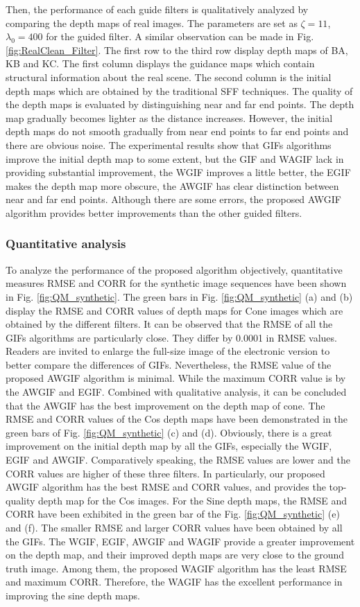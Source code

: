 \documentclass[a4paper,fleqn]{cas-dc}
\begin{document}
Then, the performance of each guide filters is qualitatively analyzed by comparing the depth maps of real images. The parameters are set as $\zeta = 11$, $\lambda_0 = 400$ for the guided filter. A similar observation can be made in Fig. \ref{fig:RealClean_Filter}. The first row to the third row display depth maps of BA, KB and KC. The first column displays the guidance maps which contain structural information about the real scene. The second column is the initial depth maps which are obtained by the traditional SFF techniques. The quality of the depth maps is evaluated by distinguishing near and far end points. The depth map gradually becomes lighter as the distance increases. However, the initial depth maps do not smooth gradually from near end points to far end points and there are obvious noise. The experimental results show that GIFs algorithms improve the initial depth map to some extent, but the GIF and WAGIF lack in providing substantial improvement, the WGIF improves a little better, the EGIF makes the depth map more obscure, the AWGIF has clear distinction between near and far end points. Although there are some errors, the proposed AWGIF algorithm provides better improvements than the other guided filters.

\subsubsection{Quantitative analysis}\label{Quantitative}
To analyze the performance of the proposed algorithm objectively, quantitative measures RMSE and CORR for the synthetic image sequences have been shown in Fig. \ref{fig:QM_synthetic}. The green bars in Fig. \ref{fig:QM_synthetic} (a) and (b) display the RMSE and CORR values of depth maps for Cone images which are obtained by the different filters. It can be observed that the RMSE of all the GIFs algorithms are particularly close. They differ by 0.0001 in RMSE values. Readers are invited to enlarge the full-size image of the electronic version to better compare the differences of GIFs. Nevertheless, the RMSE value of the proposed AWGIF algorithm is minimal. While the maximum CORR value is by the AWGIF and EGIF. Combined with qualitative analysis, it can be concluded that the AWGIF has the best improvement on the depth map of cone. The RMSE and CORR values of the Cos depth maps have been demonstrated in the green bars of Fig. \ref{fig:QM_synthetic} (c) and (d). Obviously, there is a great improvement on the initial depth map by all the GIFs, especially the WGIF, EGIF and AWGIF. Comparatively speaking, the RMSE values are lower and the CORR values are higher of these three filters. In particularly, our proposed AWGIF algorithm has the best RMSE and CORR values, and provides the top-quality depth map for the Cos images. For the Sine depth maps, the RMSE and CORR have been exhibited in the green bar of the Fig. \ref{fig:QM_synthetic} (e) and (f). The smaller RMSE and larger CORR values have been obtained by all the GIFs. The WGIF, EGIF, AWGIF and WAGIF provide a greater improvement on the depth map, and their improved depth maps are very close to the ground truth image. Among them, the proposed WAGIF algorithm has the least RMSE and maximum CORR. Therefore, the WAGIF has the excellent performance in improving the sine depth maps.
\end{document}
